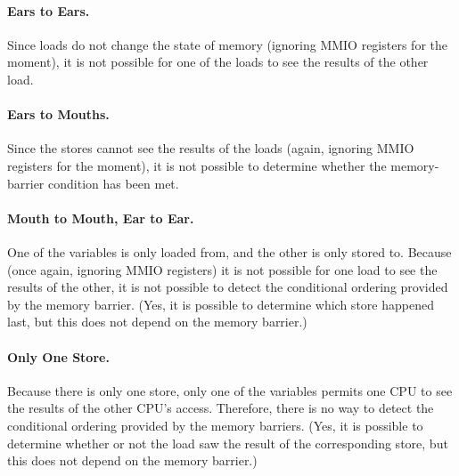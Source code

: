 \paragraph{Ears to Ears.}
	Since loads do not change the state of memory
	(ignoring MMIO registers for the moment),
	it is not possible for one of the loads to see the
	results of the other load.

\paragraph{Ears to Mouths.}
	Since the stores cannot see the results of the loads
	(again, ignoring MMIO registers for the moment),
	it is not possible to determine whether the memory-barrier
	condition has been met.

\paragraph{Mouth to Mouth, Ear to Ear.}
	One of the variables is only loaded from, and the other
	is only stored to.
	Because (once again, ignoring MMIO registers) it is not
	possible for one load to see the results of the other,
	it is not possible to detect the conditional ordering
	provided by the memory barrier.
	(Yes, it is possible to determine which store happened
	last, but this does not depend on the memory barrier.)

\paragraph{Only One Store.}
	Because there is only one store, only one of the variables
	permits one CPU to see the results of the other CPU's
	access.
	Therefore, there is no way to detect the
	conditional ordering provided by the memory barriers.
	(Yes, it is possible to determine whether or not the
	load saw the result of the corresponding store, but this
	does not depend on the memory barrier.)

